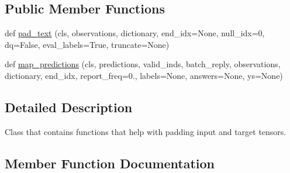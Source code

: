 \subsection*{Public Member Functions}
\begin{DoxyCompactItemize}
\item 
def \hyperlink{classparlai_1_1agents_1_1legacy__agents_1_1seq2seq_1_1utils__v0_1_1PaddingUtils_ae7f9ca3d9fd7dd823895a28af6cae34f}{pad\+\_\+text} (cls, observations, dictionary, end\+\_\+idx=None, null\+\_\+idx=0, dq=False, eval\+\_\+labels=True, truncate=None)
\item 
def \hyperlink{classparlai_1_1agents_1_1legacy__agents_1_1seq2seq_1_1utils__v0_1_1PaddingUtils_ae2c46f2f424e4301873e1c5bc201646c}{map\+\_\+predictions} (cls, predictions, valid\+\_\+inds, batch\+\_\+reply, observations, dictionary, end\+\_\+idx, report\+\_\+freq=0., labels=None, answers=None, ys=None)
\end{DoxyCompactItemize}


\subsection{Detailed Description}
\begin{DoxyVerb}Class that contains functions that help with padding input and target tensors.
\end{DoxyVerb}
 

\subsection{Member Function Documentation}
\mbox{\label{classparlai_1_1agents_1_1legacy__agents_1_1seq2seq_1_1utils__v0_1_1PaddingUtils_ae2c46f2f424e4301873e1c5bc201646c}} 
